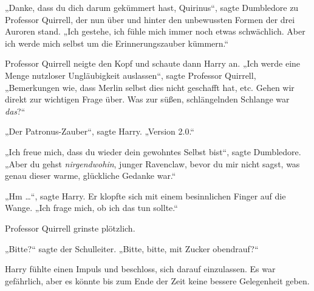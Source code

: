 „Danke, dass du dich darum gekümmert hast, Quirinus“, sagte Dumbledore zu Professor Quirrell, der nun über und hinter den unbewussten Formen der drei Auroren stand.
„Ich gestehe, ich fühle mich immer noch etwas schwächlich. Aber ich werde mich selbst um die Erinnerungszauber kümmern.“

Professor Quirrell neigte den Kopf und schaute dann Harry an.
„Ich werde eine Menge nutzloser Ungläubigkeit auslassen“, sagte Professor Quirrell,
„Bemerkungen wie, dass Merlin selbst dies nicht geschafft hat, etc. Gehen wir direkt zur wichtigen Frage über. Was zur süßen, schlängelnden Schlange war \emph{das}?“

„Der Patronus-Zauber“, sagte Harry.
„Version 2.0.“

„Ich freue mich, dass du wieder dein gewohntes Selbst bist“, sagte Dumbledore.
„Aber du gehst \emph{nirgendwohin}, junger Ravenclaw, bevor du mir nicht sagst, was genau dieser warme, glückliche Gedanke war.“

„Hm …“, sagte Harry. Er klopfte sich mit einem besinnlichen Finger auf die Wange.
„Ich frage mich, ob ich das tun sollte.“

Professor Quirrell grinste plötzlich.

„Bitte?“ sagte der Schulleiter.
„Bitte, bitte, mit Zucker obendrauf?“

Harry fühlte einen Impuls und beschloss, sich darauf einzulassen. Es war gefährlich, aber es könnte bis zum Ende der Zeit keine bessere Gelegenheit geben.

